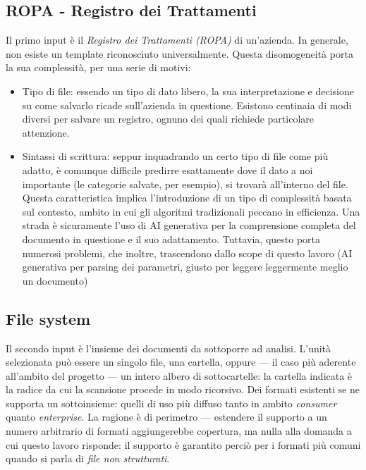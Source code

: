 \subsection{ROPA - Registro dei Trattamenti}
\label{sub:input-ROPA}
Il primo input è il \textit{Registro dei Trattamenti (ROPA)} di un'azienda. In generale, non esiste un template riconosciuto universalmente. Questa disomogeneità porta la sua complessità, per una serie di motivi:
\begin{itemize}
	\item Tipo di file: essendo un tipo di dato libero, la sua interpretazione e decisione su come salvarlo ricade sull'azienda in questione. Esistono centinaia di modi diversi per salvare un registro, ognuno dei quali richiede particolare attenzione.
	\item Sintassi di scrittura: seppur inquadrando un certo tipo di file come più adatto, è comunque difficile predirre esattamente dove il dato a noi importante (le categorie salvate, per esempio), si trovarà all'interno del file. Questa caratteristica implica l'introduzione di un tipo di complessità basata sul contesto, ambito in cui gli algoritmi tradizionali peccano in efficienza. Una strada è sicuramente l'uso di AI generativa per la comprensione completa del documento in questione e il suo adattamento. Tuttavia, questo porta numerosi problemi, che inoltre, trascendono dallo scope di questo lavoro (AI generativa per parsing dei parametri, giusto per leggere leggermente meglio un documento)
\end{itemize}

\subsection{File system}
\label{sub:input-FS}
Il secondo input è l'insieme dei documenti da sottoporre ad analisi. L'unità selezionata può essere un singolo file, una cartella, oppure --- il caso più aderente all'ambito del progetto --- un intero albero di sottocartelle: la cartella indicata è la radice da cui la scansione procede in modo ricorsivo. Dei formati esistenti se ne supporta un sottoinsieme: quelli di uso più diffuso tanto in ambito \textit{consumer} quanto \textit{enterprise}. La ragione è di perimetro --- estendere il supporto a un numero arbitrario di formati aggiungerebbe copertura, ma nulla alla domanda a cui questo lavoro risponde: il supporto è garantito perciò per i formati più comuni quando si parla di \textit{file non strutturati}.


